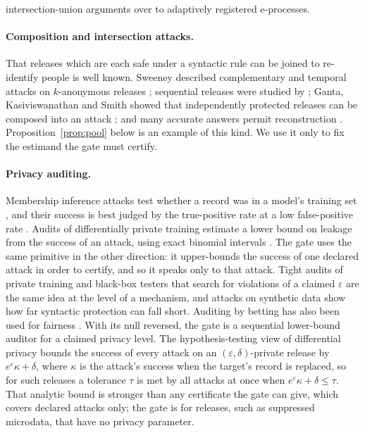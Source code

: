 \documentclass{jpc}
\theoremstyle{remark}
\begin{document}
intersection-union arguments \cite{berger1982} over to adaptively registered e-processes.

\paragraph{Composition and intersection attacks.} That releases which are each safe under a syntactic rule can be joined to re-identify people is well known. Sweeney described complementary and temporal attacks on $k$-anonymous releases \cite{sweeney2002}; sequential releases were studied by \cite{wang2006}; Ganta, Kasiviswanathan and Smith showed that independently protected releases can be composed into an attack \cite{ganta2008}; and many accurate answers permit reconstruction \cite{dinur2003}. Proposition~\ref{prop:pool} below is an example of this kind. We use it only to fix the estimand the gate must certify.

\paragraph{Privacy auditing.} Membership inference attacks test whether a record was in a model's training set \cite{shokri2017}, and their success is best judged by the true-positive rate at a low false-positive rate \cite{carlini2022}. Audits of differentially private training estimate a lower bound on leakage from the success of an attack, using exact binomial intervals \cite{jagielski2020,nasr2021,steinke2023}. The gate uses the same primitive in the other direction: it upper-bounds the success of one declared attack in order to certify, and so it speaks only to that attack. Tight audits of private training \cite{nasr2023} and black-box testers that search for violations of a claimed $\varepsilon$ \cite{ding2018,bichsel2021} are the same idea at the level of a mechanism, and attacks on synthetic data \cite{stadler2022} show how far syntactic protection can fall short. Auditing by betting has also been used for fairness \cite{chugg2023}. With its null reversed, the gate is a sequential lower-bound auditor for a claimed privacy level. The hypothesis-testing view of differential privacy \cite{wasserman2010,kairouz2017} bounds the success of every attack on an $(\varepsilon,\delta)$-private release by $e^\varepsilon\kappa+\delta$, where $\kappa$ is the attack's success when the target's record is replaced, so for such releases a tolerance $\tau$ is met by all attacks at once when $e^\varepsilon\kappa+\delta\le\tau$. That analytic bound is stronger than any certificate the gate can give, which covers declared attacks only; the gate is for releases, such as suppressed microdata, that have no privacy parameter.
\end{document}
